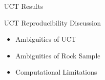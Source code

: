 \documentclass{beamer}
\begin{document}
\begin{frame}{UCT Results}
\begin{figure}[h]
\centering
{}
\hspace{1mm}
\end{figure}
\end{frame}

\begin{frame}{UCT Reproducibility Discussion}
\begin{itemize}\setlength\itemsep{1em}
\item Ambiguities of UCT
\item Ambiguities of Rock Sample
\item Computational Limitations
\end{itemize}
\end{frame}
\end{document}

